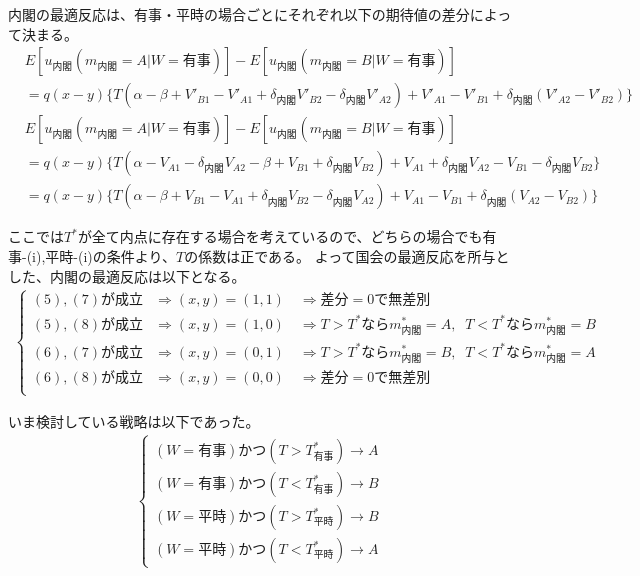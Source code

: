 \documentclass[main.tex]{subfiles}
\begin{document}
内閣の最適反応は、有事・平時の場合ごとにそれぞれ以下の期待値の差分によって決まる。
\begin{align*}
    &E[u_{内閣}(m_{内閣}=A|W=有事)] - E[u_{内閣}(m_{内閣}=B|W=有事)] \\
    &= q(x-y) \lbrace T(\alpha-\beta + V'_{B1}-V'_{A1} + \delta_{内閣}V'_{B2} - \delta_{内閣}V'_{A2}) + V'_{A1} - V'_{B1} + \delta_{内閣}(V'_{A2} - V'_{B2})  \rbrace 
\end{align*}
\begin{align*}
    &E[u_{内閣}(m_{内閣}=A|W=有事)] - E[u_{内閣}(m_{内閣}=B|W=有事)] \\
    &= q(x-y)\lbrace T(\alpha -V_{A1} -\delta_{内閣}V_{A2} - \beta + V_{B1} + \delta_{内閣}V_{B2}) + V_{A1} + \delta_{内閣}V_{A2} - V_{B1} - \delta_{内閣}V_{B2}  \rbrace\\
    &= q(x-y)\lbrace T(\alpha - \beta + V_{B1}-V_{A1} + \delta_{内閣}V_{B2} -\delta_{内閣}V_{A2}   ) + V_{A1} - V_{B1} + \delta_{内閣}(V_{A2}  - V_{B2})  \rbrace
\end{align*}


ここでは$T^*$が全て内点に存在する場合を考えているので、どちらの場合でも有事-(i),平時-(i)の条件より、$T$の係数は正である。
よって国会の最適反応を所与とした、内閣の最適反応は以下となる。
\begin{align*}
    \begin{cases}
        (5),(7)が成立 &\Rightarrow (x,y)=(1,1) \quad \Rightarrow 差分=0で無差別\\
        (5),(8)が成立 &\Rightarrow (x,y)=(1,0) \quad \Rightarrow T>T^* なら m^*_{内閣}=A,\;\; T<T^* なら m^*_{内閣}=B\\
        (6),(7)が成立 &\Rightarrow (x,y)=(0,1) \quad \Rightarrow T>T^* なら m^*_{内閣}=B,\;\; T<T^* なら m^*_{内閣}=A\\
        (6),(8)が成立 &\Rightarrow (x,y)=(0,0) \quad \Rightarrow 差分=0で無差別\\
     \end{cases}
\end{align*}

いま検討している戦略は以下であった。
\begin{align*}
    \begin{cases}
        (W=有事) かつ (T>T^*_{有事})  \rightarrow A\\
        (W=有事) かつ (T<T^*_{有事})  \rightarrow B\\
        (W=平時) かつ (T>T^*_{平時})  \rightarrow B\\
        (W=平時) かつ (T<T^*_{平時})   \rightarrow A
    \end{cases}
\end{align*}
\end{document}
